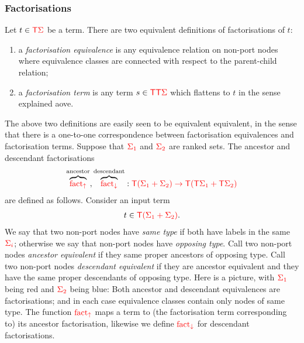 \subsubsection{Factorisations}
    Let $t \in {\color{red}{\mathsf T}} {\color{red}{\Sigma}}$ be a term. 
    There are two equivalent definitions of factorisations of $t$:
    \begin{enumerate}
        \item a \emph{factorisation equivalence} is any equivalence relation on non-port nodes where equivalence classes are connected with respect to the parent-child relation;
        \item a \emph{factorisation term} is any term $s  \in {\color{red}{\mathsf T}} {\color{red}{\mathsf T}} {\color{red}{\Sigma}}$ which flattens to $t$ in the sense explained aove.
    \end{enumerate}
    The above two definitions are easily seen to be equivalent equivalent, in the sense that there is a one-to-one correspondence between factorisation equivalences and factorisation terms.
    Suppose that ${\color{red}{\Sigma_1}}$ and ${\color{red}{\Sigma_2}}$ are ranked sets. The ancestor and descendant factorisations 
        \begin{align*}
            \overbrace{{\color{red}{\mathrm{fact_{\uparrow}}}}}^{\text{ancestor}}, \overbrace{{\color{red}{\mathrm{fact_{\downarrow}}}}}^{\text{descendant}}  : {\color{red}{{\color{red}{\mathsf T}}(\Sigma_1+\Sigma_2) \to {\color{red}{\mathsf T}}({\color{red}{\mathsf T}}\Sigma_1 + {\color{red}{\mathsf T}}\Sigma_2)}}
        \end{align*}
        are defined as follows. Consider an input term
        \begin{align*}
            t \in {\color{red}{{\color{red}{\mathsf T}}(\Sigma_1+\Sigma_2)}}.
        \end{align*}
        We say that two non-port nodes have \emph{same type} if both have labels in the same  ${\color{red}{\Sigma_i}}$; otherwise we say that non-port nodes have \emph{opposing type}.  Call two non-port nodes \emph{ancestor equivalent}  if they  same proper ancestors of opposing type. Call two non-port nodes \emph{descendant equivalent}  if they  are ancestor equivalent and they have the same proper descendants of opposing type. Here is a picture, with ${\color{red}{\Sigma_1}}$ being red and ${\color{red}{\Sigma_2}}$ being blue:
        Both ancestor and descendant equivalences are factorisations; and in each case equivalence classes contain only nodes of same type.  The function ${\color{red}{\mathrm{fact_{\uparrow}}}}$ maps a term to (the factorisation term corresponding to) its ancestor factorisation, likewise we define ${\color{red}{\mathrm{fact_{\downarrow}}}}$ for  descendant factorisations.
    
